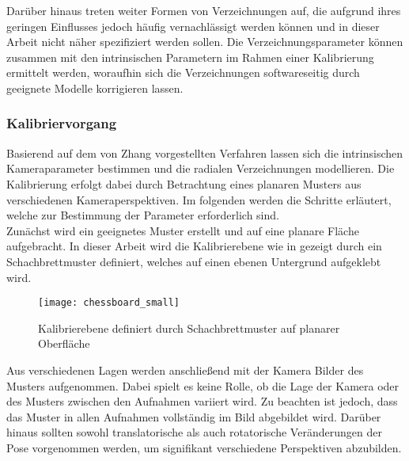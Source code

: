 
Darüber hinaus treten weiter Formen von Verzeichnungen auf, die aufgrund ihres geringen Einflusses jedoch häufig vernachlässigt werden können und in dieser Arbeit nicht näher spezifiziert werden sollen. Die Verzeichnungsparameter können zusammen mit den intrinsischen Parametern im Rahmen einer Kalibrierung ermittelt werden, woraufhin sich die Verzeichnungen softwareseitig durch geeignete Modelle korrigieren lassen. 

\subsubsection{Kalibriervorgang}
Basierend auf dem von Zhang \cite{Zhang2000} vorgestellten Verfahren lassen sich die intrinsischen Kameraparameter bestimmen und die radialen Verzeichnungen modellieren. Die Kalibrierung erfolgt dabei durch Betrachtung eines planaren Musters aus verschiedenen Kameraperspektiven. Im folgenden werden die Schritte erläutert, welche zur Bestimmung der Parameter erforderlich sind.\\

Zunächst wird ein geeignetes Muster erstellt und auf eine planare Fläche aufgebracht. In dieser Arbeit wird die Kalibrierebene wie in  gezeigt durch ein Schachbrettmuster definiert, welches auf einen ebenen Untergrund aufgeklebt wird.

\begin{figure}[ht]
	\begin{center}
		\texttt{[image: chessboard\_small]}
		\caption{Kalibrierebene definiert durch Schachbrettmuster auf planarer Oberfläche}
		\label{fig.chesscalib}
	\end{center}
\end{figure}

Aus verschiedenen Lagen werden anschließend mit der Kamera Bilder des Musters aufgenommen. Dabei spielt es keine Rolle, ob die Lage der Kamera oder des Musters zwischen den Aufnahmen variiert wird. Zu beachten ist jedoch, dass das Muster in allen Aufnahmen vollständig im Bild abgebildet wird. Darüber hinaus sollten sowohl translatorische als auch rotatorische Veränderungen der Pose vorgenommen werden, um signifikant verschiedene Perspektiven abzubilden.\\

